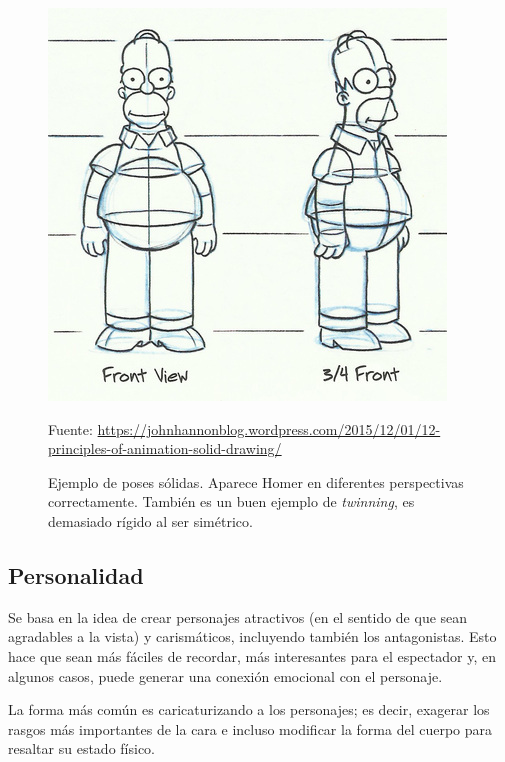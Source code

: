 \documentclass{article}
\begin{document}
\begin{figure}[H]
    \centering
    \includegraphics[width=\textwidth]{imagenes/homer-solid-drawing.jpg}
    \caption{Ejemplo de poses sólidas. Aparece Homer en diferentes perspectivas correctamente. También es un buen ejemplo de \textit{twinning}, es demasiado rígido al ser simétrico.}
    \vspace{10pt}
    \footnotesize{Fuente: \url{https://johnhannonblog.wordpress.com/2015/12/01/12-principles-of-animation-solid-drawing/}}
\end{figure}

\subsection{Personalidad}

Se basa en la idea de crear personajes atractivos (en el sentido de que sean agradables a la vista) y carismáticos, incluyendo también los antagonistas. Esto hace que sean más fáciles de recordar, más interesantes para el espectador y, en algunos casos, puede generar una conexión emocional con el personaje. \cite{idearocket}

\bigskip

La forma más común es caricaturizando a los personajes; es decir, exagerar los rasgos más importantes de la cara e incluso modificar la forma del cuerpo para resaltar su estado físico.
\end{document}
